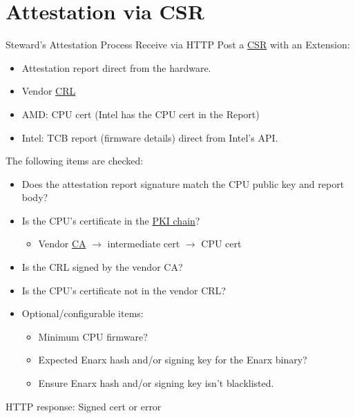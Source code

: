 \documentclass[graphics,compress]{beamer}
\begin{document}
\section{Attestation via CSR}
\begin{frame}{Steward's Attestation Process}
Receive via HTTP Post a \href{https://en.wikipedia.org/wiki/Certificate_signing_request}{CSR} with an Extension:
\begin{itemize}
    \item Attestation report direct from the hardware.
    \item Vendor \href{https://en.wikipedia.org/wiki/Certificate_revocation_list}{CRL}
    \item AMD: CPU cert (Intel has the CPU cert in the Report)
    \item Intel: TCB report (firmware details) direct from Intel's API.
\end{itemize}

The following items are checked:
\begin{itemize}
    \item Does the attestation report signature match the CPU public key and report body?
    \item Is the CPU's certificate in the \href{https://en.wikipedia.org/wiki/Chain_of_trust}{PKI chain}?
    \begin{itemize}
        \item Vendor \href{https://en.wikipedia.org/wiki/Certificate_authority}{CA} $\rightarrow$ intermediate cert $\rightarrow$ CPU cert
    \end{itemize}
    \item Is the CRL signed by the vendor CA?
    \item Is the CPU's certificate not in the vendor CRL?
    \item Optional/configurable items:
    \begin{itemize}
        \item Minimum CPU firmware?
        \item Expected Enarx hash and/or signing key for the Enarx binary?
        \item Ensure Enarx hash and/or signing key isn't blacklisted.
    \end{itemize}
\end{itemize}

HTTP response: Signed cert or error
\end{frame}
\end{document}
